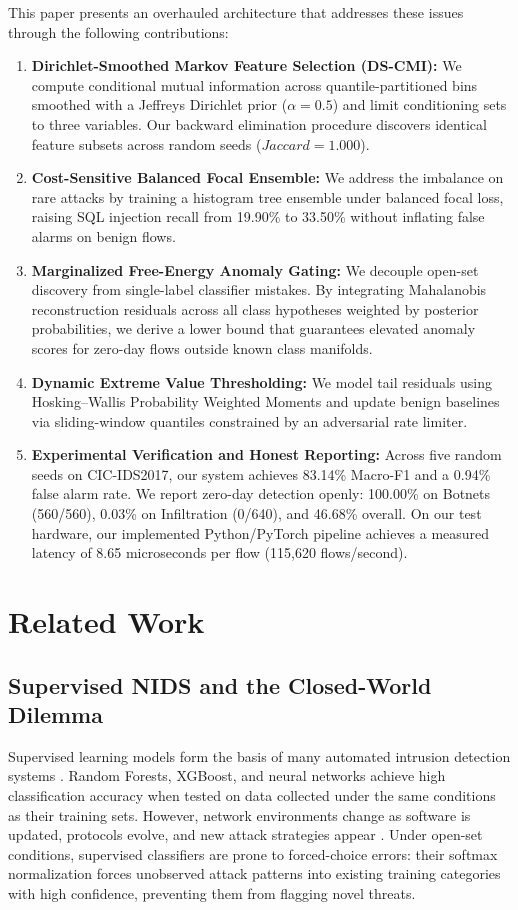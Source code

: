 \documentclass[10pt,journal,compsoc]{IEEEtran}
\begin{document}
This paper presents an overhauled architecture that addresses these issues through the following contributions:
\begin{enumerate}
    \item \textbf{Dirichlet-Smoothed Markov Feature Selection (DS-CMI):} We compute conditional mutual information across quantile-partitioned bins smoothed with a Jeffreys Dirichlet prior ($\alpha = 0.5$) and limit conditioning sets to three variables. Our backward elimination procedure discovers identical feature subsets across random seeds ($Jaccard = 1.000$).
    \item \textbf{Cost-Sensitive Balanced Focal Ensemble:} We address the imbalance on rare attacks by training a histogram tree ensemble under balanced focal loss, raising SQL injection recall from 19.90\% to 33.50\% without inflating false alarms on benign flows.
    \item \textbf{Marginalized Free-Energy Anomaly Gating:} We decouple open-set discovery from single-label classifier mistakes. By integrating Mahalanobis reconstruction residuals across all class hypotheses weighted by posterior probabilities, we derive a lower bound that guarantees elevated anomaly scores for zero-day flows outside known class manifolds.
    \item \textbf{Dynamic Extreme Value Thresholding:} We model tail residuals using Hosking--Wallis Probability Weighted Moments and update benign baselines via sliding-window quantiles constrained by an adversarial rate limiter.
    \item \textbf{Experimental Verification and Honest Reporting:} Across five random seeds on CIC-IDS2017, our system achieves 83.14\% Macro-F1 and a 0.94\% false alarm rate. We report zero-day detection openly: 100.00\% on Botnets (560/560), 0.03\% on Infiltration (0/640), and 46.68\% overall. On our test hardware, our implemented Python/PyTorch pipeline achieves a measured latency of 8.65 microseconds per flow (115,620 flows/second).
\end{enumerate}

\section{Related Work}
\subsection{Supervised NIDS and the Closed-World Dilemma}
Supervised learning models form the basis of many automated intrusion detection systems \cite{sarhan2021, panigrahi2020}. Random Forests, XGBoost, and neural networks achieve high classification accuracy when tested on data collected under the same conditions as their training sets. However, network environments change as software is updated, protocols evolve, and new attack strategies appear \cite{arora2022}. Under open-set conditions, supervised classifiers are prone to forced-choice errors: their softmax normalization forces unobserved attack patterns into existing training categories with high confidence, preventing them from flagging novel threats.
\end{document}
